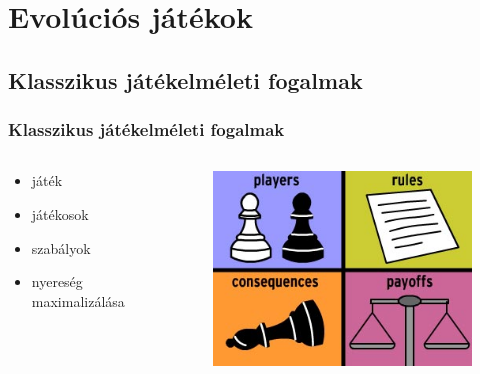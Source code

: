 \section{Evolúciós játékok}

\subsection{Klasszikus játékelméleti fogalmak}
\begin{frame}
\frametitle{Klasszikus játékelméleti fogalmak}
\begin{columns}[T]
	\begin{column}{0.5\linewidth}
\begin{itemize}
	\item játék
	\item játékosok
	\item szabályok
	\item nyereség maximalizálása
\end{itemize}

	\end{column}

	\begin{column}{0.5\linewidth}
\begin{figure}
	\includegraphics[width=\linewidth]{images/game-theory}
\end{figure}
	\end{column}
\end{columns}

\end{frame}


